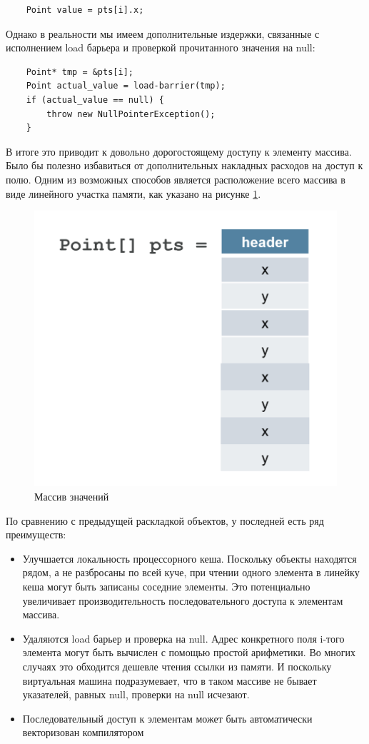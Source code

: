 \begin{lstlisting}
	Point value = pts[i].x;
\end{lstlisting}
Однако в реальности мы имеем дополнительные издержки, связанные с исполнением load барьера и проверкой прочитанного значения на null:
\begin{lstlisting}
	Point* tmp = &pts[i];
	Point actual_value = load-barrier(tmp);
	if (actual_value == null) {
		throw new NullPointerException();
	}
\end{lstlisting}
В итоге это приводит к довольно дорогостоящему доступу к элементу массива. Было бы полезно избавиться от дополнительных накладных расходов на доступ к полю. Одним из возможных способов является расположение всего массива в виде линейного участка памяти, как указано на рисунке \ref{values-graph}.

\begin{figure}[h]
	\caption{Массив значений}\label{values-graph}
	\includegraphics[width=0.65\linewidth]{image/flattened-points.png}
\end{figure}
По сравнению с предыдущей раскладкой объектов, у последней есть ряд преимуществ:
\begin{itemize}
	\item Улучшается локальность процессорного кеша. Поскольку объекты находятся рядом, а не разбросаны по всей куче, при чтении одного элемента в линейку кеша могут быть записаны соседние элементы. Это потенциально увеличивает производительность последовательного доступа к элементам массива.
	\item Удаляются load барьер и проверка на null. Адрес конкретного поля i-того элемента могут быть вычислен с помощью простой арифметики. Во многих случаях это обходится дешевле чтения ссылки из памяти. И поскольку виртуальная машина подразумевает, что в таком массиве не бывает указателей, равных null, проверки на null исчезают.
	\item Последовательный доступ к элементам может быть автоматически векторизован компилятором
\end{itemize}
